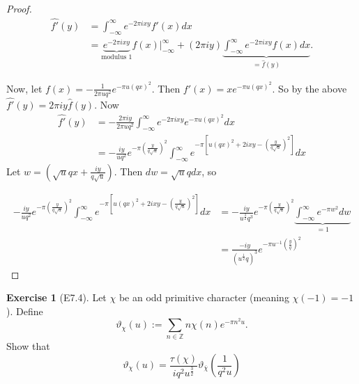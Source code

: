\documentclass[reqno]{amsart}
\theoremstyle{definition}
\newtheorem{exercise}[theorem]{Exercise}
\theoremstyle{remark}
\begin{document}
\begin{proof}
    \begin{align*}
        \hat{f'}(y) 
        &= \int_{-\infty}^{\infty} 
        e^{-2 \pi i x y} f'(x) dx \\
        &= \underbrace{e^{- 2 \pi i xy}}_{
        \text{modulus }1}f(x)  \bigg|_{-\infty}^{\infty}
        + \left( 2\pi i y \right) 
        \underbrace{\int_{-\infty}^{\infty}  
        e^{-2 \pi i xy}f(x) dx}_{= \hat{f}(y)}.
    \end{align*}

    Now,
    let 
    $f(x) = - \frac{1}{2\pi u q^2} e^{-\pi u \left( qx \right)^2}$.
    Then $f'(x) = x e^{-\pi u \left( qx \right)^2}$.
    So by the above
    $\hat{f'}(y) = 
    2 \pi i y \hat{f}(y)$.
    Now
    \begin{align*}
    \hat{f'}(y) 
    &=-\frac{2 \pi i y}{2\pi u q^2} \int_{-\infty}^{\infty}  
    e^{- 2 \pi i x y} e^{-\pi u \left( qx \right)^2} dx\\
    &= - \frac{iy}{u q^2}
    e^{-\pi \left( \frac{y}{q \sqrt{u}  } \right)^2}
    \int_{-\infty}^{\infty} 
    e^{- \pi \left[ u \left( qx \right)^2 + 2i xy -
    \left(  \frac{y}{q \sqrt{u}  } \right)^2  \right] } dx
    \end{align*}
    Let
    $w = \left( \sqrt{u} qx + \frac{iy}{q \sqrt{u} } \right) $.
    Then $dw = \sqrt{u} q dx$, so

    \begin{align*}
     - \frac{iy}{u q^2}
    e^{-\pi \left( \frac{y}{q \sqrt{u}  } \right)^2}
    \int_{-\infty}^{\infty} 
    e^{- \pi \left[ u \left( qx \right)^2 + 2i xy -
    \left(  \frac{y}{q \sqrt{u}  } \right)^2  \right] } dx
    &=
     - \frac{iy}{u^{\frac{3}{2}} q^3}
    e^{-\pi \left( \frac{y}{q \sqrt{u}  } \right)^2}
    \underbrace{\int_{-\infty}^{\infty} 
    e^{- \pi w^2} dw}_{=1}\\
    &= \frac{- iy}{\left( u^{\frac{1}{2}}q \right)^3}
    e^{- \pi u^{-1} \left( \frac{y}{q} \right)^2}
    \end{align*}

\end{proof}

\begin{exercise}[E7.4]
    Let $\chi$ be an odd primitive character
    (meaning $\chi(-1) = -1$ ). Define
    \[
    \vartheta_{\chi}(u)
    := \sum_{n \in \mathbb{Z}} n \chi(n)
    e^{-\pi n^2 u}.
    \] 
    Show that
    \[
    \vartheta_{\chi}(u)
    = \frac{\tau(\chi)}{iq^2 u ^{\frac{3}{2}}}
    \vartheta_{\overline{\chi}} 
    \left( \frac{1}{q^2 u} \right) 
    \] 
\end{exercise}
\end{document}

